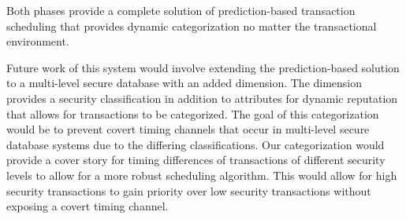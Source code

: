 Both phases provide a complete solution of prediction-based transaction scheduling that provides dynamic categorization no matter the transactional environment. 

Future work of this system would involve extending the prediction-based solution to a multi-level secure database with an added dimension. The dimension provides a security classification in addition to attributes for dynamic reputation that allows for transactions to be categorized. The goal of this categorization would be to prevent covert timing channels that occur in  multi-level secure database systems due to the differing classifications. Our categorization would provide a cover story for timing differences of transactions of different security levels to allow for a more robust scheduling algorithm. This would allow for high security transactions to gain priority over low security transactions without exposing a covert timing channel.


